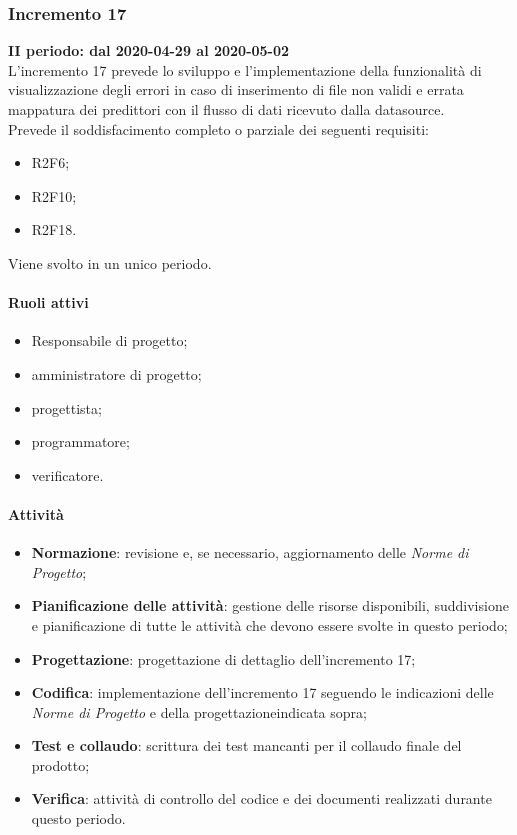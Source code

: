 \subsubsection{Incremento 17}
\textbf{II periodo: dal 2020-04-29 al 2020-05-02} \\
L'incremento 17 prevede lo sviluppo e l'implementazione della funzionalità di visualizzazione degli errori in caso di inserimento di file non validi e errata mappatura dei predittori con il flusso di dati ricevuto dalla datasource.
\\Prevede il soddisfacimento completo o parziale dei seguenti requisiti:
\begin{itemize}
	\item R2F6;
	\item R2F10;
	\item R2F18.
\end{itemize}
Viene svolto in un unico periodo.
\paragraph{Ruoli attivi}
\begin{itemize}
	\item Responsabile di progetto\glo;
	\item amministratore di progetto\glo;
	\item progettista;
	\item programmatore;
	\item verificatore.
\end{itemize}
\paragraph{Attività}
\begin{itemize}
	\item \textbf{Normazione}: revisione e, se necessario, aggiornamento delle \textit{Norme di Progetto};
	\item \textbf{Pianificazione delle attività}: gestione delle risorse disponibili, suddivisione e pianificazione di tutte le attività che devono essere svolte in questo periodo;
	\item \textbf{Progettazione}: progettazione di dettaglio dell'incremento 17;
	\item \textbf{Codifica}: implementazione dell'incremento 17 seguendo le indicazioni delle \textit{Norme di Progetto} e della progettazione\glosp indicata sopra;
	\item \textbf{Test e collaudo}: scrittura dei test mancanti per il collaudo finale del prodotto\glo;
	\item \textbf{Verifica}: attività di controllo del codice e dei documenti realizzati durante questo periodo.
\end{itemize}

